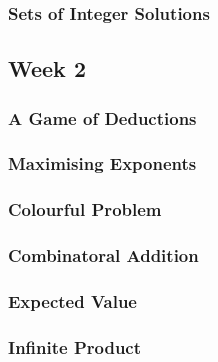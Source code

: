 \documentclass[titlepage=true]{scrartcl}
\begin{document}
        \subsubsection{Sets of Integer Solutions}
            \label{2-1-7}
                    
        \newpage 

    \subsection{Week 2}
    
        \subsubsection{A Game of Deductions}
            \label{2-2-1}
            
        \newpage

        \subsubsection{Maximising Exponents}
            \label{2-2-2}
            
        \newpage
            
        \subsubsection{Colourful Problem}
            \label{2-2-3}
                
        \newpage 
        
        \subsubsection{Combinatoral Addition}
            \label{2-2-4}
            
        \newpage 

        \subsubsection{Expected Value}
            \label{2-2-5}
            
        \newpage

        \subsubsection{Infinite Product}
            \label{2-2-6}
            
        \newpage
\end{document}
